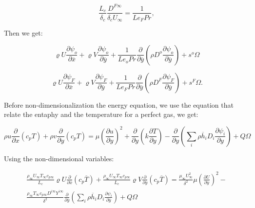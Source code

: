 \begin{equation} 
\frac{L_c}{\delta_c}
\frac{D^{F\infty}}{\delta_cU_\infty}=\frac{1}{Le_FPr},
\end{equation} 

Then we get:

\begin{equation} 
\varrho U\frac{\partial \psi_{o}}{\partial\overline{x}}+
\varrho V\frac{\partial \psi_{o}}{\partial\overline{y}}+
\frac{1}{Le_oPr}\frac{\partial}{\partial \overline{y}}\left(\rho D^o\frac{\partial \psi_o}{\partial \overline{y}}\right)+
s^{o}\Omega
\end{equation} 

\begin{equation} 
\varrho U\frac{\partial \psi_{F}}{\partial\overline{x}}+
\varrho V\frac{\partial \psi_{F}}{\partial\overline{y}}+
\frac{1}{Le_FPr}\frac{\partial}{\partial \overline{y}}\left(\rho D^F\frac{\partial \psi_F}{\partial \overline{y}}\right)+
s^{F}\Omega.
\end{equation} 


Before non-dimensionalization the energy equation, we use the equation that relate the entaphy and 
the temperature for a perfect gas, we get: 

\begin{equation}
\rho u \frac{\partial }{\partial x}(c_p T)+
\rho v \frac{\partial }{\partial y}(c_p T)=
\mu
\left(
\frac{\partial u}{\partial y}
\right)^2
+
\frac{\partial}{\partial y}\left(k\frac{\partial T}{\partial y}\right)
-
\frac{\partial }{\partial y}
\left(
\sum_i\rho \overline{h}_iD_i\frac{\partial \psi_i}{\partial y}
\right)
+
Q\Omega
\end{equation} 

Using the non-dimensional variables:

\begin{equation}
\begin{split}
\frac{\rho_{\infty}U_{\infty}T_{\infty}c_{p\infty}}{L_c}\varrho U\frac{\partial }{\partial \overline{x}}(c_p \overline{T})+
\frac{\rho_{\infty}U_{\infty}T_{\infty}c_{p\infty}}{L_c}\varrho V\frac{\partial }{\partial \overline{y}}(c_p \overline{T})=
\frac{\mu_{\infty}U_{\infty}^2}{\delta^2}
\mu
\left(
\frac{\partial U}{\partial \overline{y}}
\right)^2
-
\\
\frac{\rho_{\infty}T_{\infty}c_{p\infty}D^{i\infty}Y^{i\infty}}{\delta^2}
\frac{\partial }{\partial \overline{y}}
\left(
\sum_i\rho \overline{h}_i D_i\frac{\partial \psi_i}{\partial \overline{y}}
\right)
+
Q\Omega
\end{split}
\end{equation} 

